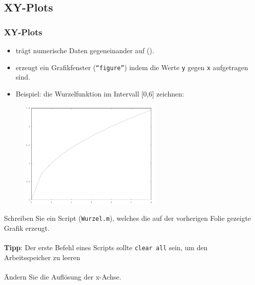       \subsection{XY-Plots}
      \begin{frame}
          \frametitle{XY-Plots}

          \vspace{-0.5cm}

          \begin{itemize}
              \item {} trägt numerische Daten gegeneinander auf ().
              \item {} erzeugt ein Grafikfenster (\texttt{``figure''}) indem die Werte \texttt{y} gegen \texttt{x} aufgetragen sind.
              \item Beispiel: die Wurzelfunktion im Intervall [0,6] zeichnen:
          \end{itemize}

          \vspace{-0.3cm}

          \begin{figure}
              \includegraphics[width=7.0cm]{example2_1.png}
          \end{figure}
      \end{frame}

      \secMexercise
      \begin{frame}
          \frameMexercise
          \begin{exercise}
              \sloppy
              Schreiben Sie ein Script (\texttt{Wurzel.m}), welches die auf der vorherigen Folie gezeigte Grafik erzeugt.\\ \\

              \textbf{Tipp}: Der erste Befehl eines Scripts sollte \texttt{clear all} sein, um den Arbeitsspeicher zu leeren\\ \\

              Ändern Sie die Auflösung der x-Achse.
          \end{exercise}
      \end{frame}


